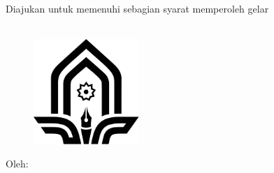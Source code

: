 %
%
%

\thispagestyle{plain}

\begin{center}
 \vspace*{0cm}

    \vspace*{1.0cm}
    \bo{\Judul} \\[1.0cm]

    \vspace*{0.5cm}
    \bo{\MakeUppercase{\Type}} \\

    \vspace*{1cm}
        Diajukan untuk memenuhi sebagian syarat memperoleh gelar \\
    \gelar\\

    \vspace*{1cm}
        \begin{figure}
        \begin{center}
            \includegraphics[width=4cm]{assets/pics/logo-aswad.ps}
        \end{center}
    \end{figure}

    \vspace*{1cm}
    Oleh:\\
    \underline{\bo{\Penulis}} \\
     \\

    \vfill

\end{center}

